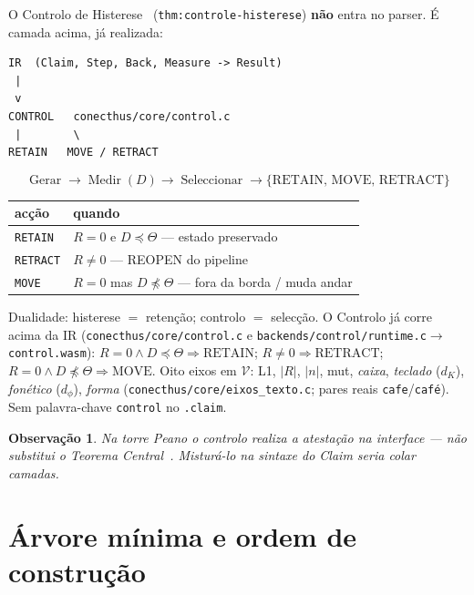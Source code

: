 \documentclass[11pt,a4paper]{article}
\newcommand{\code}[1]{\texttt{\small #1}}
\newtheorem{observacao}[teorema]{Observação}
\begin{document}
O Controlo de Histerese~\cite{peano} (\code{thm:controle-histerese})
\textbf{não} entra no parser. É camada acima, já realizada:

\begin{verbatim}
IR  (Claim, Step, Back, Measure -> Result)
 |
 v
CONTROL   conecthus/core/control.c
 |        \
RETAIN   MOVE / RETRACT
\end{verbatim}

\[
\boxed{
\operatorname{Gerar}
\to
\operatorname{Medir}(D)
\to
\operatorname{Seleccionar}
\to
\{\mathrm{RETAIN},\,\mathrm{MOVE},\,\mathrm{RETRACT}\}
}
\]

\begin{center}\small
\begin{tabular}{@{}ll@{}}
\toprule
acção & quando \\
\midrule
\code{RETAIN} & $R=0$ e $D\preceq\Theta$ --- estado preservado \\
\code{RETRACT} & $R\neq0$ --- REOPEN do pipeline \\
\code{MOVE} & $R=0$ mas $D\npreceq\Theta$ --- fora da borda / muda andar \\
\bottomrule
\end{tabular}
\end{center}

\noindent Dualidade: histerese $=$ retenção; controlo $=$ selecção. O Controlo
já corre acima da IR (\code{conecthus/core/control.c} e
\code{backends/control/runtime.c}$\to$\code{control.wasm}):
$R=0\wedge D\preceq\Theta\Rightarrow\mathrm{RETAIN}$;
$R\neq0\Rightarrow\mathrm{RETRACT}$; $R=0\wedge D\npreceq\Theta\Rightarrow\mathrm{MOVE}$.
Oito eixos em $\mathcal{V}$: L1, $|R|$, $|n|$, mut, \emph{caixa},
\emph{teclado} ($d_K$), \emph{fonético} ($d_{\phi}$), \emph{forma}
(\code{conecthus/core/eixos\_texto.c}; pares reais \texttt{cafe}/\texttt{café}).
Sem palavra-chave \code{control} no \code{.claim}.

\begin{observacao}
Na torre Peano o controlo realiza a atestação na interface --- não substitui
o Teorema Central~\cite{peano}. Misturá-lo na sintaxe do Claim seria colar
camadas.
\end{observacao}

\section{Árvore mínima e ordem de construção}\label{sec:arvore}
\end{document}
